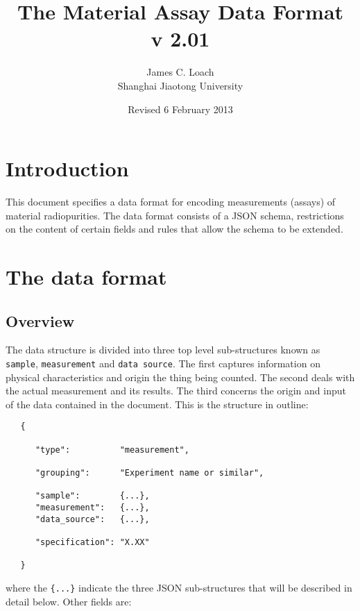 \documentclass[11pt, letterpaper]{article}
\begin{document}
 
\title{The Material Assay Data Format \\ v 2.01}
\author{James C. Loach \\ Shanghai Jiaotong University }
\date{Revised 6 February 2013}



\maketitle 
 
\section{Introduction}

This document specifies a data format for encoding measurements (assays) of material radiopurities. The data format consists of a JSON schema, restrictions on the content of certain fields and rules that allow the schema to be extended.

\section{The data format}

\subsection{Overview} 

The data structure is divided into three top level sub-structures known as \texttt{sample}, \texttt{measurement} and \texttt{data source}. The first captures information on physical characteristics and origin the thing being counted. The second deals with the actual measurement and its results. The third concerns the origin and input of the data contained in the document. This is the structure in outline:

\begin{small}
\begin{verbatim}
   {

      "type":          "measurement",

      "grouping":      "Experiment name or similar",
      
      "sample":        {...},  
      "measurement":   {...},   
      "data_source":   {...},   
 
      "specification": "X.XX"

   }
\end{verbatim}
\end{small}
where the \verb|{...}| indicate the three JSON sub-structures that will be described in detail below. Other fields are:
\end{document}
